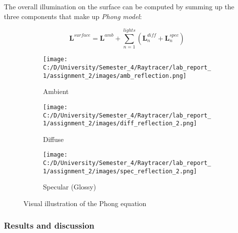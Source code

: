 \documentclass{article}
\begin{document}
	The overall illumination on the surface can be computed by summing up the three components that make up \textit{Phong model}:
	
	\begin{equation}
		\pmb{L}^{surface}= \pmb{L}^{amb} + \sum_{n=1}^{lights} (\pmb{L}_n^{diff} + \pmb{L}_n^{spec})
	\end{equation}
	
	
	\begin{figure}[ht]
		\begin{center}
			\begin{subfigure}{.3\textwidth}
				\centering
				\texttt{[image: C:/D/University/Semester\_4/Raytracer/lab\_report\_1/assignment\_2/images/amb\_reflection.png]}  
				\caption{Ambient}
				\label{fig:sub-first}
			\end{subfigure}
			\begin{subfigure}{.3\textwidth}
				\centering
				\texttt{[image: C:/D/University/Semester\_4/Raytracer/lab\_report\_1/assignment\_2/images/diff\_reflection\_2.png]}  
				\caption{Diffuse}
				\label{fig:sub-second}
			\end{subfigure}
			\begin{subfigure}{.3\textwidth}
				\centering
				\texttt{[image: C:/D/University/Semester\_4/Raytracer/lab\_report\_1/assignment\_2/images/spec\_reflection\_2.png]}  
				\caption{ Specular (Glossy)}
				\label{fig:sub-third}
			\end{subfigure}
			
			\caption{Visual illustration of the Phong equation}
			\label{fig:6}
		\end{center}
	\end{figure}
	
	\subsubsection{Results and discussion}
	
\end{document}
